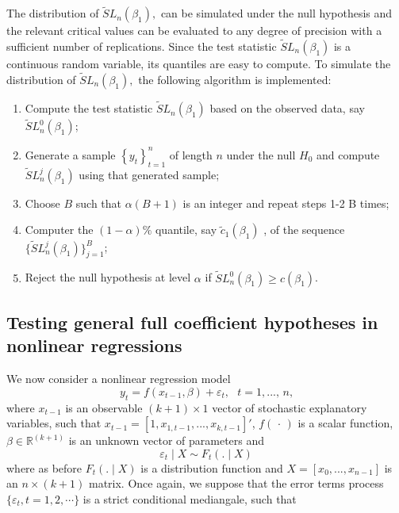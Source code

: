 \documentclass[harvard,11pt]{article}
\begin{document}
The distribution of $\tilde{S}%
L_{n}(\beta _{1}),$ can be simulated under the null
hypothesis and the relevant critical values can be evaluated to any degree
of precision with a sufficient number of replications. %
Since the test statistic $\tilde{S}L_{n}(\beta _{1})$ is a continuous random variable, its quantiles are easy to compute. To simulate the distribution of 
$\tilde{S}L_{n}(\beta _{1}),$ the following algorithm is implemented:
\begin{enumerate}
\item Compute the test statistic $\tilde{S}L_{n}(\beta _{1})$ based on the
observed data, say $\tilde{S}L_{n}^{0}(\beta _{1})$;

\item Generate a sample $\left\{ y_{t}\right\} _{t=1}^{n}$ of length $n$
under the null $H_{0}$ and compute $\tilde{S}L_{n}^{j}(\beta _{1})$ using
that generated sample;

\item Choose $B$ such that $\alpha (B+1)$ is an integer and repeat steps 1-2
B times;

\item Computer the $(1-\alpha )\%$ quantile, say $\tilde{c}_{1}(\beta _{1})$%
, of the sequence $\{\tilde{S}L_{n}^{j}(\beta _{1})\}_{j=1}^{B}$;

\item Reject the null hypothesis at level $\alpha $ if $\tilde{S}L_{n}^{0}(\beta
_{1})\geq c(\beta _{1})$.
\end{enumerate}

\subsection{Testing general full coefficient hypotheses in nonlinear
regressions \label{sec: Testing general full coefficient hypotheses in
nonlinear regressions}}

We now consider a nonlinear regression model%
\begin{equation}
y_{t}=f(x_{t-1},\beta )+\varepsilon_{t},\text{ }t=1,...,\,n\text{,}
\label{nonlinearC1}
\end{equation}%
where $x_{t-1}$ is an observable $(k+1)\times 1$ vector of stochastic
explanatory variables, such that $x_{t-1}=[1,x_{1,t-1},...,x_{k,t-1}]'$, $f(\,\cdot \,)$ is a scalar function, $\beta \in 
\mathbb{R}^{(k+1)}$ is an unknown vector of parameters and
\begin{equation*}
\varepsilon_{t}\mid X \sim F_{t}(.\mid X)
\end{equation*}%
where as before $F_{t}(.\mid X)$ is a distribution function and $X=[x_0,...,x_{n-1}]$ is an $n\times (k+1)$ matrix. Once again, we suppose that the error terms process $\{\varepsilon_t,t=1,2,\cdots\}$ is a strict conditional mediangale, such that
\end{document}
